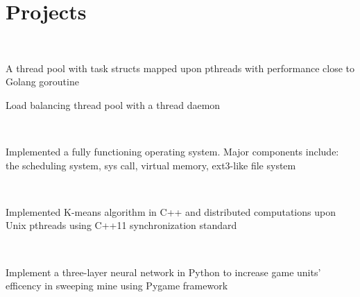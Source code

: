 \documentclass[]{deedy-resume-openfont}
\begin{document}
\sectionsep

%
%
\section{Projects}
\raggedright

\\
\begin{tightemize}
	\item A thread pool with task structs mapped upon pthreads with performance close to Golang goroutine
	\item Load balancing thread pool with a thread daemon
\end{tightemize}
\sectionsep

\\
\begin{tightemize}
	\item Implemented a fully functioning operating system. Major components include: the scheduling system, sys call, virtual memory, ext3-like file system
\end{tightemize}
\sectionsep

\hfill \\
\begin{tightemize}
	\item Implemented K-means algorithm in C++ and distributed computations upon Unix pthreads using C++11 synchronization standard
\end{tightemize}
\sectionsep

\\
\begin{tightemize}
	\item Implement a three-layer neural network in Python to increase game units' efficency in sweeping mine using Pygame framework\\
\end{tightemize}
\sectionsep
\end{document}
